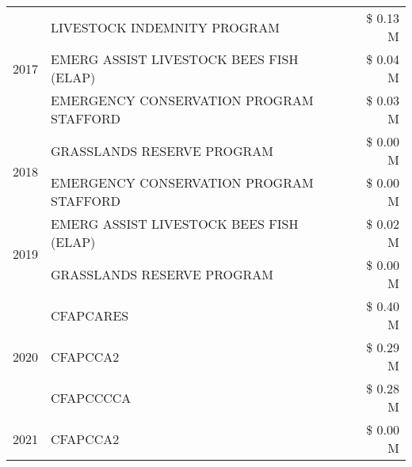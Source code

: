 \begin{tabular}{llr}
\cline{1-3}
\multirow[t]{3}{*}{2017} & LIVESTOCK INDEMNITY PROGRAM & \$ 0.13 M \\
 & EMERG ASSIST LIVESTOCK BEES FISH (ELAP) & \$ 0.04 M \\
 & EMERGENCY CONSERVATION PROGRAM STAFFORD & \$ 0.03 M \\
\cline{1-3}
\multirow[t]{2}{*}{2018} & GRASSLANDS RESERVE PROGRAM & \$ 0.00 M \\
 & EMERGENCY CONSERVATION PROGRAM STAFFORD & \$ 0.00 M \\
\cline{1-3}
\multirow[t]{2}{*}{2019} & EMERG ASSIST LIVESTOCK BEES FISH (ELAP) & \$ 0.02 M \\
 & GRASSLANDS RESERVE PROGRAM & \$ 0.00 M \\
\cline{1-3}
\multirow[t]{3}{*}{2020} & CFAPCARES & \$ 0.40 M \\
 & CFAPCCA2 & \$ 0.29 M \\
 & CFAPCCCCA & \$ 0.28 M \\
\cline{1-3}
2021 & CFAPCCA2 & \$ 0.00 M \\
\cline{1-3}
\bottomrule
\end{tabular}
